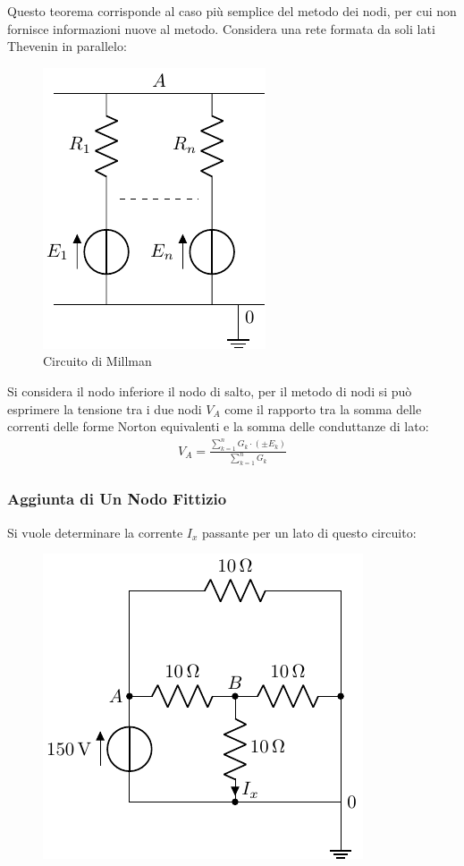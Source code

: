 \documentclass{article}
\numberwithin{equation}{subsection}
\begin{document}
Questo teorema corrisponde al caso più semplice del metodo dei nodi, per cui non fornisce informazioni nuove al metodo. Considera una rete formata da soli lati Thevenin in 
parallelo:
\begin{figure}[H]%
    \centering
    \includegraphics{circuito-millman.pdf}%
    \caption{Circuito di Millman}%
    \label{fig:circuito-millman}
\end{figure}
Si considera il nodo inferiore il nodo di salto, per il metodo di nodi si può esprimere la tensione tra i due nodi $V_A$ come il rapporto tra la somma delle correnti delle 
forme Norton equivalenti e la somma delle conduttanze di lato:
\begin{gather}
    V_A=\displaystyle\frac{\sum_{k=1}^nG_k\cdot(\pm E_k)}{\sum_{k=1}^nG_k}
\end{gather}

\subsubsection{Aggiunta di Un Nodo Fittizio}

Si vuole determinare la corrente $I_x$ passante per un lato di questo circuito:
\begin{figure}[H]%
    \centering
    \includegraphics{circuito-3.pdf}%
    \label{fig:circuito-3}
\end{figure}
\end{document}
